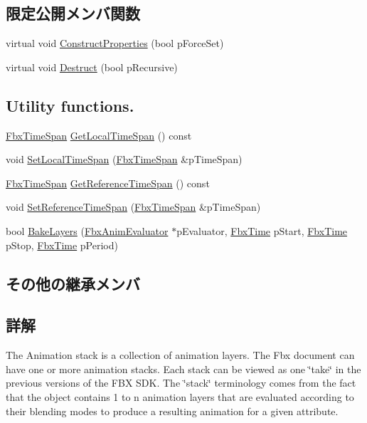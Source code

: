 \subsection*{限定公開メンバ関数}
\begin{DoxyCompactItemize}
\item 
virtual void \hyperlink{class_fbx_anim_stack_a41c0a8c693a1dcf5ba2e150b7ea89aa3}{Construct\+Properties} (bool p\+Force\+Set)
\item 
virtual void \hyperlink{class_fbx_anim_stack_a4809de086c3a2d28d98d771b011599d6}{Destruct} (bool p\+Recursive)
\end{DoxyCompactItemize}
\subsection*{Utility functions.}
\begin{DoxyCompactItemize}
\item 
\hyperlink{class_fbx_time_span}{Fbx\+Time\+Span} \hyperlink{class_fbx_anim_stack_a61d246d787a9ac3ab230527e9bab00bb}{Get\+Local\+Time\+Span} () const
\item 
void \hyperlink{class_fbx_anim_stack_ae7d19d4d0cbc6e01fef742b9acaa036e}{Set\+Local\+Time\+Span} (\hyperlink{class_fbx_time_span}{Fbx\+Time\+Span} \&p\+Time\+Span)
\item 
\hyperlink{class_fbx_time_span}{Fbx\+Time\+Span} \hyperlink{class_fbx_anim_stack_a01aacdecb9d3e1860e015aa364111239}{Get\+Reference\+Time\+Span} () const
\item 
void \hyperlink{class_fbx_anim_stack_ae63b01339e65e5a6c52ce532e0006e8b}{Set\+Reference\+Time\+Span} (\hyperlink{class_fbx_time_span}{Fbx\+Time\+Span} \&p\+Time\+Span)
\item 
bool \hyperlink{class_fbx_anim_stack_a20891f3e62c6a50a628f2ed65616bf36}{Bake\+Layers} (\hyperlink{class_fbx_anim_evaluator}{Fbx\+Anim\+Evaluator} $\ast$p\+Evaluator, \hyperlink{class_fbx_time}{Fbx\+Time} p\+Start, \hyperlink{class_fbx_time}{Fbx\+Time} p\+Stop, \hyperlink{class_fbx_time}{Fbx\+Time} p\+Period)
\end{DoxyCompactItemize}
\subsection*{その他の継承メンバ}


\subsection{詳解}
The Animation stack is a collection of animation layers. The Fbx document can have one or more animation stacks. Each stack can be viewed as one \char`\"{}take\char`\"{} in the previous versions of the F\+BX S\+DK. The \char`\"{}stack\char`\"{} terminology comes from the fact that the object contains 1 to n animation layers that are evaluated according to their blending modes to produce a resulting animation for a given attribute. 

